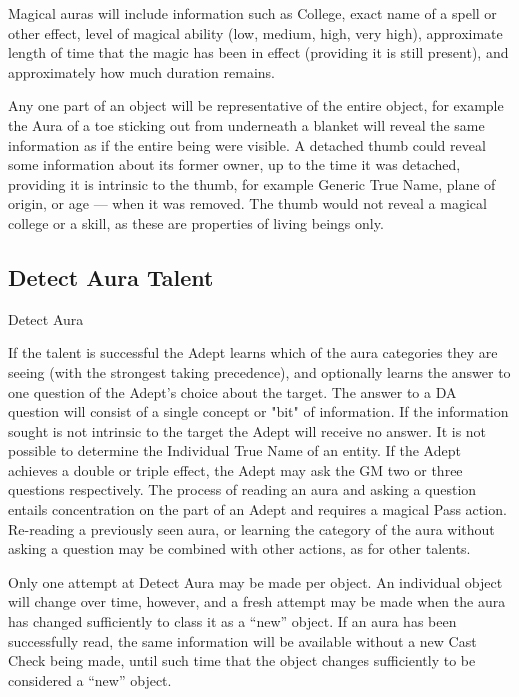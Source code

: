 \begin{multicols*}{3}
Magical auras will include information such as College, exact name of
a spell or other effect, level of magical ability (low, medium, high,
very high), approximate length of time that the magic has been in
effect (providing it is still present), and approximately how much
duration remains.

Any one part of an object will be representative of the entire object,
for example the Aura of a toe sticking out from underneath a blanket
will reveal the same information as if the entire being were
visible. A detached thumb could reveal some information about its
former owner, up to the time it was detached, providing it is
intrinsic to the thumb, for example Generic True Name, plane of
origin, or age --- when it was removed.  The thumb would not reveal a
magical college or a skill, as these are properties of living beings
only.

\subsection{Detect Aura Talent}
\label{magic:detect-aura}

\begin{talent}{Detect Aura}

\begin{effects}
If the talent is successful the Adept learns which of the aura
categories they are seeing (with the strongest taking precedence), and
optionally learns the answer to one question of the Adept's choice
about the target. The answer to a DA question will consist of a single
concept or "bit" of information. If the information sought is not
intrinsic to the target the Adept will receive no answer. It is not
possible to determine the Individual True Name of an entity. If the
Adept achieves a double or triple effect, the Adept may ask the GM two
or three questions respectively. The process of reading an aura and
asking a question entails concentration on the part of an Adept and
requires a magical Pass action.  Re-reading a previously seen aura, or
learning the category of the aura without asking a question may be
combined with other actions, as for other talents.

Only one attempt at Detect Aura may be made per object. An individual
object will change over time, however, and a fresh attempt may be made
when the aura has changed sufficiently to class it as a ``new'' object.
If an aura has been successfully read, the same information will be
available without a new Cast Check being made, until such time that
the object changes sufficiently to be considered a ``new'' object.


\end{effects}
\end{talent}
\end{multicols*}
